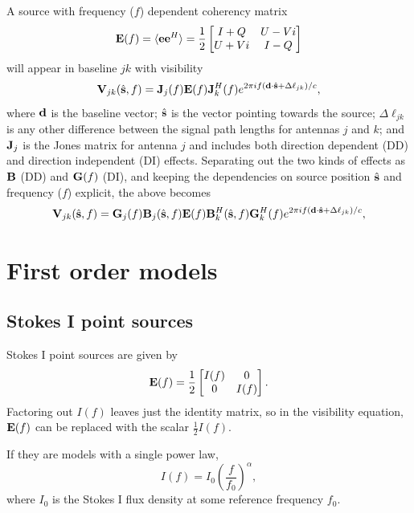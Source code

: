 \documentclass{book}
\newcommand{\shat}{\hat{\bf s}}
\begin{document}
A source with frequency ($f$) dependent coherency matrix
\begin{equation}
    {\bf E}(f)
        = \langle{\bf e}{\bf e}^H\rangle
        = \frac12 \begin{bmatrix} I+Q & U-Vi \\ U+Vi & I-Q \end{bmatrix}
\end{equation}
will appear in baseline $jk$ with visibility
\begin{equation}
    {\bf V}_{jk}(\shat,f) = {\bf J}_j(f){\bf E}(f){\bf J}_k^H(f) e^{2\pi i f ({\bf d}\cdot\shat + \Delta\ell_{jk})/c},
\end{equation}
where ${\bf d}$ is the baseline vector; $\shat$ is the vector pointing towards the source; $\Delta\ell_{jk}$ is any other difference between the signal path lengths for antennas $j$ and $k$; and ${\bf J}_j$ is the Jones matrix for antenna $j$ and includes both direction dependent (DD) and direction independent (DI) effects.
Separating out the two kinds of effects as ${\bf B}$ (DD) and ${\bf G}(f)$ (DI), and keeping the dependencies on source position $\shat$ and frequency ($f$) explicit, the above becomes
\begin{equation}
    {\bf V}_{jk}(\shat,f) = {\bf G}_j(f){\bf B}_j(\shat,f){\bf E}(f){\bf B}_k^H(\shat,f){\bf G}_k^H(f) e^{2\pi i f ({\bf d}\cdot\shat + \Delta\ell_{jk})/c},
\end{equation}

\section{First order models}

\subsection{Stokes I point sources}

Stokes I point sources are given by
\begin{equation}
    {\bf E}(f) = \frac12 \begin{bmatrix} I(f) & 0 \\ 0 & I(f) \end{bmatrix}.
\end{equation}
Factoring out $I(f)$ leaves just the identity matrix, so in the visibility equation, ${\bf E}(f)$ can be replaced with the scalar $\frac12 I(f)$.

If they are models with a single power law,
\begin{equation}
    I(f) = I_0 \left(\frac{f}{f_0}\right)^\alpha,
\end{equation}
where $I_0$ is the Stokes I flux density at some reference frequency $f_0$.
\end{document}
